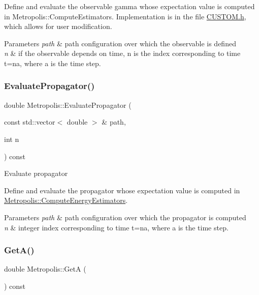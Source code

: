 Define and evaluate the observable gamma whose expectation value is computed in Metropolis\+::\+Compute\+Estimators. Implementation is in the file \hyperlink{CUSTOM_8h}{C\+U\+S\+T\+O\+M.\+h}, which allows for user modification. 
\begin{DoxyParams}{Parameters}
{\em path} & path configuration over which the observable is defined \\
\hline
{\em n} & if the observable depends on time, n is the index corresponding to time t=na, where a is the time step. \\
\hline
\end{DoxyParams}
\mbox{\label{classMetropolis_aa0e41567dcbb736f1bcc4a09dbb5f6fb}} 
\subsubsection{\texorpdfstring{Evaluate\+Propagator()}{EvaluatePropagator()}}
{\footnotesize\ttfamily double Metropolis\+::\+Evaluate\+Propagator (\begin{DoxyParamCaption}\item[{const std\+::vector$<$ double $>$ \&}]{path,  }\item[{int}]{n }\end{DoxyParamCaption}) const}

Evaluate propagator

Define and evaluate the propagator whose expectation value is computed in \hyperlink{classMetropolis_a197d44f9109ce75781a70441f1d0b2b2}{Metropolis\+::\+Compute\+Energy\+Estimators}. 
\begin{DoxyParams}{Parameters}
{\em path} & path configuration over which the propagator is computed \\
\hline
{\em n} & integer index corresponding to time t=na, where a is the time step. \\
\hline
\end{DoxyParams}
\mbox{\label{classMetropolis_a5fef962bc6deca9c57dc377ef5000432}} 
\subsubsection{\texorpdfstring{Get\+A()}{GetA()}}
{\footnotesize\ttfamily double Metropolis\+::\+GetA (\begin{DoxyParamCaption}{ }\end{DoxyParamCaption}) const}

